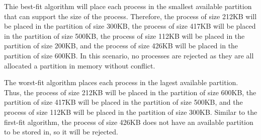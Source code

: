 \documentclass[letterpaper, 10pt,DIV=13]{scrartcl}
\numberwithin{equation}{section} %
\numberwithin{figure}{section} %
\numberwithin{table}{section} %
\begin{document}
Thie best-fit algorithm will place each process in the smallest available partition that can support the size of the process. Therefore, the process of size 212KB will be placed in the partition of size 300KB, the process of size 417KB will be placed in the partition of size 500KB, the process of size 112KB will be placed in the partition of size 200KB, and the process of size 426KB will be placed in the partition of size 600KB. In this scenario, no processes are rejected as they are all allocated a partition in memory without conflict.

The worst-fit algorithm places each process in the lagest available partition. Thus, the process of size 212KB will be placed in the partition of size 600KB, the partition of size 417KB will be placed in the partition of size 500KB, and the process of size 112KB will be placed in the partition of size 300KB. Similar to the first-fit algorithm, the process of size 426KB does not have an available partition to be stored in, so it will be rejected.
\end{document}
